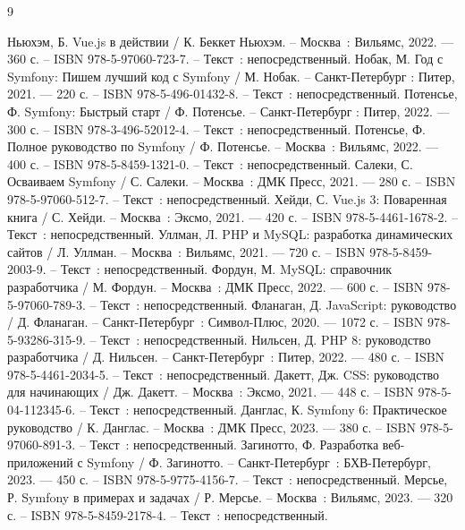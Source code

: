 
\begin{thebibliography}{9}

     Ньюхэм, Б. Vue.js в действии / К. Беккет Ньюхэм. – Москва~: Вильямс, 2022. — 360 с. – ISBN 978-5-97060-723-7. – Текст~: непосредственный.
     Нобак, М. Год с Symfony: Пишем лучший код с Symfony / М. Нобак. – Санкт-Петербург : Питер, 2021. — 220 с. – ISBN 978-5-496-01432-8. – Текст~: непосредственный.
     Потенсье, Ф. Symfony: Быстрый старт / Ф. Потенсье. – Санкт-Петербург : Питер, 2022. — 300 с. – ISBN 978-3-496-52012-4. – Текст~: непосредственный.
    	Потенсье, Ф. Полное руководство по Symfony / Ф. Потенсье. – Москва~: Вильямс, 2022. — 400 с. – ISBN 978-5-8459-1321-0. – Текст~: непосредственный.
		Салеки, С. Осваиваем Symfony / С. Салеки. – Москва~: ДМК Пресс, 2021. — 280 с. – ISBN 978-5-97060-512-7. – Текст~: непосредственный.
	 Хейди, С. Vue.js 3: Поваренная книга / С. Хейди. – Москва~: Эксмо, 2021. — 420 с. – ISBN 978-5-4461-1678-2. – Текст~: непосредственный.
	 Уллман, Л. PHP и MySQL: разработка динамических сайтов / Л. Уллман. – Москва~: Вильямс, 2021. — 720 с. – ISBN 978-5-8459-2003-9. – Текст~: непосредственный.
	 Фордун, М. MySQL: справочник разработчика / М. Фордун. – Москва~: ДМК Пресс, 2022. — 600 с. – ISBN 978-5-97060-789-3. – Текст~: непосредственный.
	 Фланаган, Д. JavaScript: руководство / Д. Фланаган. – Санкт-Петербург~: Символ-Плюс, 2020. — 1072 с. – ISBN 978-5-93286-315-9. – Текст~: непосредственный.
	 Нильсен, Д. PHP 8: руководство разработчика / Д. Нильсен. – Санкт-Петербург~: Питер, 2022. — 480 с. – ISBN 978-5-4461-2034-5. – Текст~: непосредственный.
	 Дакетт, Дж. CSS: руководство для начинающих / Дж. Дакетт. – Москва~: Эксмо, 2021. — 448 с. – ISBN 978-5-04-112345-6. – Текст~: непосредственный.
	 Данглас, К. Symfony 6: Практическое руководство / К. Данглас. – Москва~: ДМК Пресс, 2023. — 380 с. – ISBN 978-5-97060-891-3. – Текст~: непосредственный.
	 Загинотто, Ф. Разработка веб-приложений с Symfony / Ф. Загинотто. – Санкт-Петербург~: БХВ-Петербург, 2023. — 450 с. – ISBN 978-5-9775-4156-7. – Текст~: непосредственный.
	 Мерсье, Р. Symfony в примерах и задачах / Р. Мерсье. – Москва~: Вильямс, 2023. — 320 с. – ISBN 978-5-8459-2178-4. – Текст~: непосредственный.
	

\end{thebibliography}
